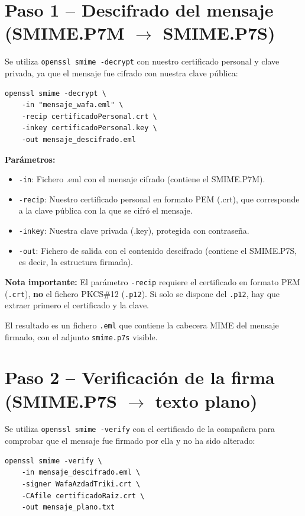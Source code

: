 \section{Paso 1 -- Descifrado del mensaje (SMIME.P7M $\rightarrow$ SMIME.P7S)}

Se utiliza \texttt{openssl smime -decrypt} con nuestro certificado personal y clave privada, ya que el mensaje fue cifrado con nuestra clave pública:

\begin{lstlisting}[caption=Descifrado del mensaje S/MIME]
openssl smime -decrypt \
    -in "mensaje_wafa.eml" \
    -recip certificadoPersonal.crt \
    -inkey certificadoPersonal.key \
    -out mensaje_descifrado.eml
\end{lstlisting}

\textbf{Parámetros:}
\begin{itemize}[label=\textbullet]
    \item \texttt{-in}: Fichero .eml con el mensaje cifrado (contiene el SMIME.P7M).
    \item \texttt{-recip}: Nuestro certificado personal en formato PEM (.crt), que corresponde a la clave pública con la que se cifró el mensaje.
    \item \texttt{-inkey}: Nuestra clave privada (.key), protegida con contraseña.
    \item \texttt{-out}: Fichero de salida con el contenido descifrado (contiene el SMIME.P7S, es decir, la estructura firmada).
\end{itemize}

\textbf{Nota importante:} El parámetro \texttt{-recip} requiere el certificado en formato PEM (\texttt{.crt}), \textbf{no} el fichero PKCS\#12 (\texttt{.p12}). Si solo se dispone del \texttt{.p12}, hay que extraer primero el certificado y la clave.

El resultado es un fichero \texttt{.eml} que contiene la cabecera MIME del mensaje firmado, con el adjunto \texttt{smime.p7s} visible.

\section{Paso 2 -- Verificación de la firma (SMIME.P7S $\rightarrow$ texto plano)}

Se utiliza \texttt{openssl smime -verify} con el certificado de la compañera para comprobar que el mensaje fue firmado por ella y no ha sido alterado:

\begin{lstlisting}[caption=Verificación de la firma S/MIME]
openssl smime -verify \
    -in mensaje_descifrado.eml \
    -signer WafaAzdadTriki.crt \
    -CAfile certificadoRaiz.crt \
    -out mensaje_plano.txt
\end{lstlisting}

